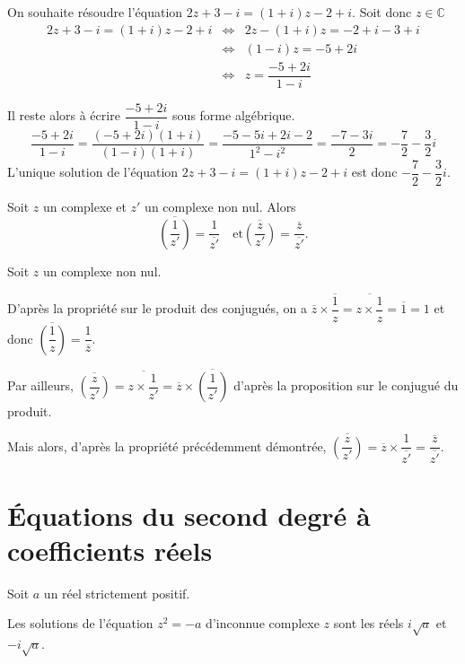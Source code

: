 \documentclass[11pt,fleqn, openany]{book} %
\begin{document}
\begin{example}On souhaite résoudre l'équation $2z+3-i=(1+i)z-2+i$. Soit donc $z \in \mathbb{C}$
\begin{eqnarray*}
2z+3-i=(1+i)z-2+i & \Leftrightarrow & 2z-(1+i)z=-2+i-3+i \\
& \Leftrightarrow & (1-i)z = -5+2i \\
& \Leftrightarrow & z = \dfrac{-5+2i}{1-i}
\end{eqnarray*}

Il reste alors à écrire $\dfrac{-5+2i}{1-i}$ sous forme algébrique.
\[\dfrac{-5+2i}{1-i}=\dfrac{(-5+2i)(1+i)}{(1-i)(1+i)}=\dfrac{-5-5i+2i-2}{1^2-i^2}=\dfrac{-7-3i}{2}=-\dfrac{7}{2}-\dfrac{3}{2}i\]
L'unique solution de l'équation $2z+3-i=(1+i)z-2+i$ est donc $-\dfrac{7}{2}-\dfrac{3}{2}i$.\end{example}

\begin{proposition}Soit $z$ un complexe et $z'$ un complexe non nul. Alors
\[ \overline{\left(\dfrac{1}{z'}\right)} = \dfrac{1}{\overline{z'}} \quad \text{et} \overline{\left(\dfrac{z}{z'}\right)} = \dfrac{\overline{z}}{\overline{z'}}.\]\end{proposition}

\begin{demonstration}Soit $z$ un complexe non nul. 

D'après la propriété sur le produit des conjugués, on a $\overline{z} \times \overline{\dfrac{1}{z}}=\overline{z \times \dfrac{1}{z}} = \overline{1}=1$ et donc
$\overline{\left(\dfrac{1}{z}\right)} = \dfrac{1}{\overline{z}}$.

Par ailleurs, $\overline{\left(\dfrac{z}{z'}\right)} = \overline{z \times \dfrac{1}{z'}} = \overline{z} \times \overline{\left(\dfrac{1}{z'}\right)}$
d'après la proposition sur le conjugué du produit. 

Mais alors, d'après la propriété précédemment démontrée, $\overline{\left(\dfrac{z}{z'}\right)} = \overline{z} \times \dfrac{1}{\overline{z'}}= \dfrac{\overline{z}}{\overline{z'}}$.
\end{demonstration}

\section{Équations du second degré à coefficients réels}

\begin{proposition}Soit $a$ un réel strictement positif.

Les solutions de l'équation $z^2=-a$ d'inconnue complexe $z$ sont les réels $i\sqrt{a}$ et $-i\sqrt{a}$.\end{proposition}
\end{document}
